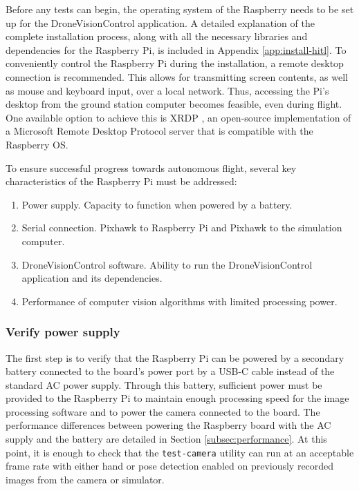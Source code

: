 Before any tests can begin, the operating system of the Raspberry needs to be set up for the DroneVisionControl application. A detailed explanation of the complete installation process, along with all the necessary libraries and dependencies for the Raspberry Pi, is included in Appendix \ref{app:install-hitl}. To conveniently control the Raspberry Pi during the installation, a remote desktop connection is recommended. This allows for transmitting screen contents, as well as mouse and keyboard input, over a local network. Thus, accessing the Pi's desktop from the ground station computer becomes feasible, even during flight. One available option to achieve this is XRDP \cite{xrdp-front}, an open-source implementation of a Microsoft Remote Desktop Protocol server that is compatible with the Raspberry OS.

To ensure successful progress towards autonomous flight, several key characteristics of the Raspberry Pi must be addressed:
\begin{enumerate}
    \item Power supply. Capacity to function when powered by a battery.
    \item Serial connection. Pixhawk to Raspberry Pi and Pixhawk to the simulation computer.
    \item DroneVisionControl software. Ability to run the DroneVisionControl application and its dependencies.
    \item Performance of computer vision algorithms with limited processing power.
\end{enumerate}


\subsubsection{Verify power supply}

The first step is to verify that the Raspberry Pi can be powered by a secondary battery connected to the board's power port by a USB-C cable instead of the standard AC power supply. Through this battery, sufficient power must be provided to the Raspberry Pi to maintain enough processing speed for the image processing software and to power the camera connected to the board. The performance differences between powering the Raspberry board with the AC supply and the battery are detailed in Section \ref{subsec:performance}. At this point, it is enough to check that the \texttt{test-camera} utility can run at an acceptable frame rate with either hand or pose detection enabled on previously recorded images from the camera or simulator.


